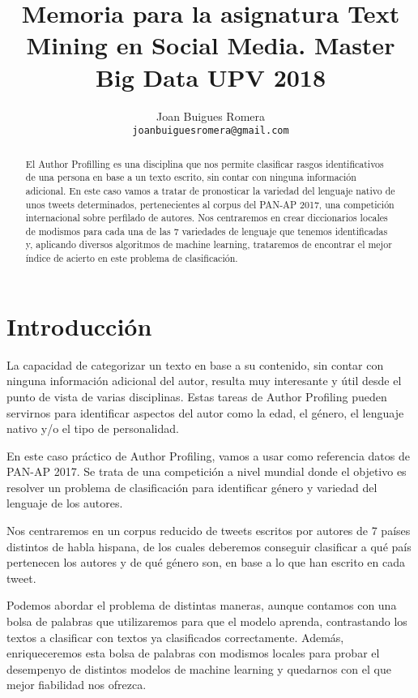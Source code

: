 \documentclass[11pt,a4paper]{article}
\title{Memoria para la asignatura Text Mining en Social Media. Master Big Data UPV 2018}
\author{Joan Buigues Romera \\
  {\tt joanbuiguesromera@gmail.com} \\}
\date{}
\begin{document}
\maketitle
\begin{abstract}
  El Author Profilling es una disciplina que nos permite clasificar rasgos identificativos de una persona en base a un texto escrito, sin contar con ninguna información adicional. En este caso vamos a tratar de pronosticar la variedad del lenguaje nativo de unos tweets determinados, pertenecientes al corpus del PAN-AP 2017, una competici\'on internacional sobre perfilado de autores. Nos centraremos en crear diccionarios locales de modismos para cada una de las 7 variedades de lenguaje que tenemos identificadas y, aplicando diversos algoritmos de machine learning, trataremos de encontrar el mejor \'indice de acierto en este problema de clasificaci\'on.
\end{abstract}


\section{Introducci\'on}

La capacidad de categorizar un texto en base a su contenido, sin contar con ninguna informaci\'on adicional del autor, resulta muy interesante y \'util desde el punto de vista de varias disciplinas. Estas tareas de Author Profiling pueden servirnos para identificar aspectos del autor como la edad, el g\'enero, el lenguaje nativo y/o el tipo de personalidad. 


En este caso pr\'actico de Author Profiling, vamos a usar como referencia datos de PAN-AP 2017. Se trata de una competici\'on a nivel mundial donde el objetivo es resolver un problema de clasificaci\'on para identificar g\'enero y variedad del lenguaje de los autores. 

Nos centraremos en un corpus reducido de tweets escritos por autores de 7 pa\'ises distintos de habla hispana, de los cuales deberemos conseguir clasificar a qu\'e pa\'is pertenecen los autores y de qu\'e género son, en base a lo que han escrito en cada tweet.

Podemos abordar el problema de distintas maneras, aunque contamos con una bolsa de palabras que utilizaremos para que el modelo aprenda, contrastando los textos a clasificar con textos ya clasificados correctamente. Adem\'as, enriqueceremos esta bolsa de palabras con modismos locales para probar el desempenyo de distintos modelos de machine learning y quedarnos con el que mejor fiabilidad nos ofrezca.
\end{document}

